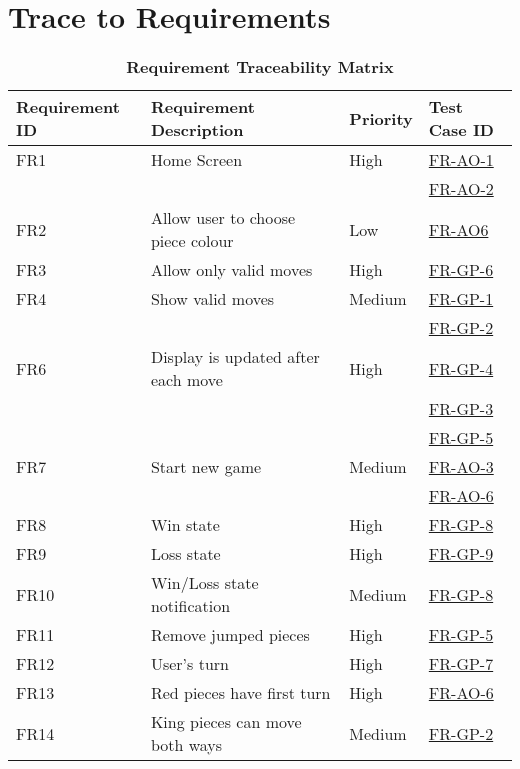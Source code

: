 \documentclass[12pt, titlepage]{article}
\begin{document}
\section{Trace to Requirements}
\newpage
\begin{table}[H]
    \begin{center}
	\caption{\bf Requirement Traceability Matrix}
 	\begin{adjustwidth}{-1.5cm}{}
	\begin{tabularx}{1.2\textwidth}{|p{3.4cm}|p{7cm}|p{1.6cm}|X|}
		\hline 
		{\bf Requirement ID}  & {\bf Requirement Description} & {\bf Priority} & {\bf Test Case ID} \\
		\hline
		FR1 & Home Screen & High & \hyperref[FR-AO-1]{FR-AO-1}\\
		& & & \hyperref[FR-AO-2]{FR-AO-2}\\
		\hline
		FR2 & Allow user to choose piece colour & Low & \hyperref[FR-AO-6/7]{FR-AO6}\\
		\hline
		FR3 & Allow only valid moves & High & \hyperref[FR-GP-6]{FR-GP-6}\\
		\hline
		FR4 & Show valid moves & Medium & \hyperref[FR-GP-1/2]{FR-GP-1}\\
		& & & \hyperref[FR-GP-1/2]{FR-GP-2}\\
		\hline
		FR6 & Display is updated after each move & High & \hyperref[FR-GP-4]{FR-GP-4}\\
		& & & \hyperref[FR-GP-3]{FR-GP-3}\\
		& & & \hyperref[FR-GP-5]{FR-GP-5}\\
		\hline
		FR7 & Start new game & Medium & \hyperref[FR-AO-3]{FR-AO-3}\\
		& & & \hyperref[FR-AO-6/7]{FR-AO-6}\\
		\hline
		FR8 & Win state & High & \hyperref[FR-GP-8/9]{FR-GP-8} \\
		\hline
		FR9 & Loss state & High & \hyperref[FR-GP-8/9]{FR-GP-9} \\
		\hline
		FR10 & Win/Loss state notification & Medium & \hyperref[FR-GP-8/9]{FR-GP-8} \\
		\hline
		FR11 & Remove jumped pieces & High & \hyperref[FR-GP-5]{FR-GP-5}\\
		\hline
		FR12 & User's turn & High & \hyperref[FR-GP-7]{FR-GP-7}\\
		\hline
		FR13 & Red pieces have first turn & High &  \hyperref[FR-AO-6/7]{FR-AO-6}\\
		\hline
		FR14 & King pieces can move both ways & Medium & \hyperref[FR-GP-1/2]{FR-GP-2}\\

\end{tabularx}
\end{adjustwidth}
\end{center}
\end{table}
\end{document}
